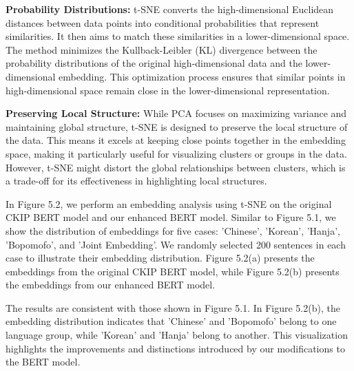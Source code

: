 \documentclass[PhD]{PHlab-thesis}
\begin{document}
\textbf{Probability Distributions:} t-SNE converts the high-dimensional Euclidean distances between data points into conditional probabilities that represent similarities. It then aims to match these similarities in a lower-dimensional space. The method minimizes the Kullback-Leibler (KL) divergence between the probability distributions of the original high-dimensional data and the lower-dimensional embedding. This optimization process ensures that similar points in high-dimensional space remain close in the lower-dimensional representation.

\textbf{Preserving Local Structure:} While PCA focuses on maximizing variance and maintaining global structure, t-SNE is designed to preserve the local structure of the data. This means it excels at keeping close points together in the embedding space, making it particularly useful for visualizing clusters or groups in the data. However, t-SNE might distort the global relationships between clusters, which is a trade-off for its effectiveness in highlighting local structures.

In Figure 5.2, we perform an embedding analysis using t-SNE on the original CKIP BERT model and our enhanced BERT model. Similar to Figure 5.1, we show the distribution of embeddings for five cases: 'Chinese', 'Korean', 'Hanja', 'Bopomofo', and 'Joint Embedding'. We randomly selected 200 sentences in each case to illustrate their embedding distribution. Figure 5.2(a) presents the embeddings from the original CKIP BERT model, while Figure 5.2(b) presents the embeddings from our enhanced BERT model.

The results are consistent with those shown in Figure 5.1. In Figure 5.2(b), the embedding distribution indicates that 'Chinese' and 'Bopomofo' belong to one language group, while 'Korean' and 'Hanja' belong to another. This visualization highlights the improvements and distinctions introduced by our modifications to the BERT model.
\end{document}
